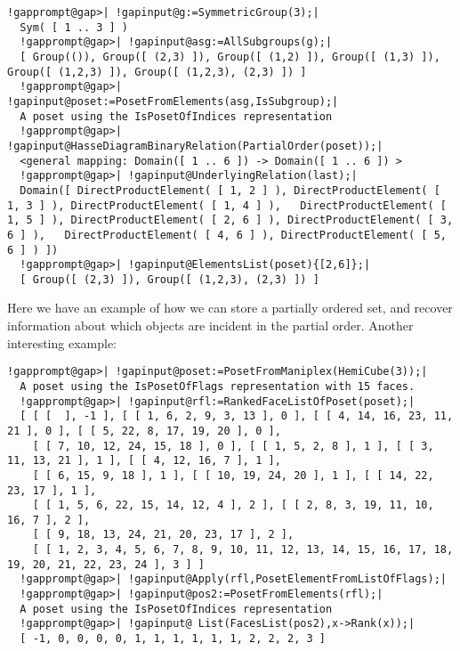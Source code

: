 \documentclass[a4paper,11pt]{report}
\begin{document}
{{ 
\begin{Verbatim}[commandchars=!@|,fontsize=\small,frame=single,label=Example]
  !gapprompt@gap>| !gapinput@g:=SymmetricGroup(3);|
  Sym( [ 1 .. 3 ] )
  !gapprompt@gap>| !gapinput@asg:=AllSubgroups(g);|
  [ Group(()), Group([ (2,3) ]), Group([ (1,2) ]), Group([ (1,3) ]), Group([ (1,2,3) ]), Group([ (1,2,3), (2,3) ]) ]
  !gapprompt@gap>| !gapinput@poset:=PosetFromElements(asg,IsSubgroup);|
  A poset using the IsPosetOfIndices representation 
  !gapprompt@gap>| !gapinput@HasseDiagramBinaryRelation(PartialOrder(poset));|
  <general mapping: Domain([ 1 .. 6 ]) -> Domain([ 1 .. 6 ]) >
  !gapprompt@gap>| !gapinput@UnderlyingRelation(last);|
  Domain([ DirectProductElement( [ 1, 2 ] ), DirectProductElement( [ 1, 3 ] ), DirectProductElement( [ 1, 4 ] ),   DirectProductElement( [ 1, 5 ] ), DirectProductElement( [ 2, 6 ] ), DirectProductElement( [ 3, 6 ] ),   DirectProductElement( [ 4, 6 ] ), DirectProductElement( [ 5, 6 ] ) ])
  !gapprompt@gap>| !gapinput@ElementsList(poset){[2,6]};|
  [ Group([ (2,3) ]), Group([ (1,2,3), (2,3) ]) ]
\end{Verbatim}
 Here we have an example of how we can store a partially ordered set, and
recover information about which objects are incident in the partial order.
Another interesting example: 
\begin{Verbatim}[commandchars=!@|,fontsize=\small,frame=single,label=Example]
  !gapprompt@gap>| !gapinput@poset:=PosetFromManiplex(HemiCube(3));|
  A poset using the IsPosetOfFlags representation with 15 faces.
  !gapprompt@gap>| !gapinput@rfl:=RankedFaceListOfPoset(poset);|
  [ [ [  ], -1 ], [ [ 1, 6, 2, 9, 3, 13 ], 0 ], [ [ 4, 14, 16, 23, 11, 21 ], 0 ], [ [ 5, 22, 8, 17, 19, 20 ], 0 ], 
    [ [ 7, 10, 12, 24, 15, 18 ], 0 ], [ [ 1, 5, 2, 8 ], 1 ], [ [ 3, 11, 13, 21 ], 1 ], [ [ 4, 12, 16, 7 ], 1 ], 
    [ [ 6, 15, 9, 18 ], 1 ], [ [ 10, 19, 24, 20 ], 1 ], [ [ 14, 22, 23, 17 ], 1 ], 
    [ [ 1, 5, 6, 22, 15, 14, 12, 4 ], 2 ], [ [ 2, 8, 3, 19, 11, 10, 16, 7 ], 2 ], 
    [ [ 9, 18, 13, 24, 21, 20, 23, 17 ], 2 ], 
    [ [ 1, 2, 3, 4, 5, 6, 7, 8, 9, 10, 11, 12, 13, 14, 15, 16, 17, 18, 19, 20, 21, 22, 23, 24 ], 3 ] ]
  !gapprompt@gap>| !gapinput@Apply(rfl,PosetElementFromListOfFlags);|
  !gapprompt@gap>| !gapinput@pos2:=PosetFromElements(rfl);|
  A poset using the IsPosetOfIndices representation 
  !gapprompt@gap>| !gapinput@ List(FacesList(pos2),x->Rank(x));|
  [ -1, 0, 0, 0, 0, 1, 1, 1, 1, 1, 1, 2, 2, 2, 3 ]
\end{Verbatim}
 
}}
\end{document}
